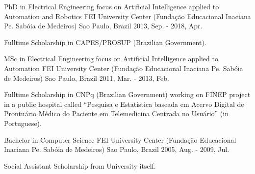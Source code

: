 

\begin{cventries}

  \cventry
    {PhD in Electrical Engineering focus on Artificial Intelligence applied to Automation and Robotics}
    {FEI University Center (Fundação Educacional Inaciana Pe. Sabóia de Medeiros)} %
    {Sao Paulo, Brazil} %
    {2013, Sep. - 2018, Apr.}
    {
          \begin{cvitems} %
            \item {Fulltime Scholarship in CAPES/PROSUP (Brazilian Government).}
          \end{cvitems}
    }

  \cventry
    {MSc in Electrical Engineering focus on Artificial Intelligence applied to Automation}
    {FEI University Center (Fundação Educacional Inaciana Pe. Sabóia de Medeiros)} %
    {Sao Paulo, Brazil} %
    {2011, Mar. - 2013, Feb.}
    {
          \begin{cvitems} %
            \item {Fulltime Scholarship in CNPq (Brazilian Government) working on FINEP project in a public hospital called ``Pesquisa e Estatística baseada em Acervo Digital de Prontuário Médico do Paciente em Telemedicina Centrada no Usuário'' (in Portuguese).}
          \end{cvitems}
    }

  \cventry
    {Bachelor in Computer Science} %
    {FEI University Center (Fundação Educacional Inaciana Pe. Sabóia de Medeiros)} %
    {Sao Paulo, Brazil} %
    {2005, Aug. - 2009, Jul.} %
    {
            \begin{cvitems} %
              \item {Social Assistant Scholarship from University itself.}
            \end{cvitems}
    }

\end{cventries}
